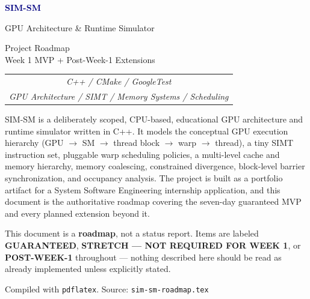 \documentclass[11pt]{article}
\newcommand{\guaranteed}{\textcolor{accentgreen}{\textbf{GUARANTEED}}}
\newcommand{\stretchtag}{\textcolor{warnred}{\textbf{STRETCH --- NOT REQUIRED FOR WEEK 1}}}
\newcommand{\postweek}{\textcolor{steel}{\textbf{POST-WEEK-1}}}
\begin{document}
\begin{titlepage}
\centering
\vspace*{2.5cm}

{\Huge \textbf{\textcolor{navy}{SIM-SM}}}

\vspace{0.5cm}
{\Large \textcolor{steel}{GPU Architecture \& Runtime Simulator}}

\vspace{1.5cm}

{\large Project Roadmap}\\[0.3cm]
{\normalsize Week 1 MVP + Post-Week-1 Extensions}

\vspace{1cm}

\begin{tabular}{c}
\textit{C++ / CMake / GoogleTest} \\
\textit{GPU Architecture / SIMT / Memory Systems / Scheduling}
\end{tabular}

\vspace{2cm}

\begin{minipage}{0.8\textwidth}
\centering
\small
SIM-SM is a deliberately scoped, CPU-based, educational GPU architecture and
runtime simulator written in C++. It models the conceptual GPU execution
hierarchy (GPU $\rightarrow$ SM $\rightarrow$ thread block $\rightarrow$ warp
$\rightarrow$ thread), a tiny SIMT instruction set, pluggable warp
scheduling policies, a multi-level cache and memory hierarchy, memory
coalescing, constrained divergence, block-level barrier synchronization, and
occupancy analysis. The project is built as a portfolio artifact for a
System Software Engineering internship application, and this document is
the authoritative roadmap covering the seven-day guaranteed MVP and every
planned extension beyond it.
\end{minipage}

\vspace{2cm}
{\small This document is a \textbf{roadmap}, not a status report. Items are
labeled \guaranteed{}, \stretchtag{}, or \postweek{} throughout --- nothing
described here should be read as already implemented unless explicitly
stated.}

\vfill
{\small Compiled with \texttt{pdflatex}. Source: \texttt{sim-sm-roadmap.tex}}
\end{titlepage}
\end{document}
